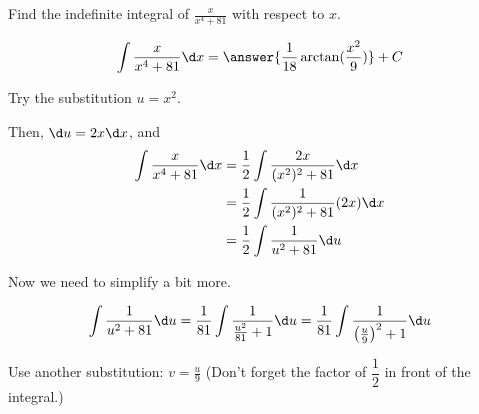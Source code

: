 \documentclass{ximera}
\author{Gregory Hartman \and Matthew Carr\and Nela Lakos \and Bobby Ramsey}
\begin{document}
\begin{exercise}

Find the indefinite integral of $\frac{x}{x^4+81}$ with respect to $x$.

\[
\int \frac{x}{x^4+81}\d x=\answer{\frac{1}{18}\arctan(\frac{x^2}{9})}+C
\]
\begin{hint}
	Try the substitution $u=x^2$.
\end{hint}

\begin{hint}
	Then,  $\d u=2x \d x$, and 
	\begin{align*}
		\int \frac{x}{x^4+81} \d x &= \dfrac{1}{2} \int \frac{2x}{(x^2)^2+81} \d x\\
			&= \dfrac{1}{2} \int \frac{1}{(x^2)^2+81} (2x) \d x\\
			&= \dfrac{1}{2} \int \frac{1}{u^2+81}  \d u
	\end{align*}
	
	Now we need to simplify a bit more.

	\[
	\int \frac{1}{u^2+81}\d u=\frac{1}{81}\int \frac{1}{\frac{u^2}{81}+1}\d u=\frac{1}{81}\int \frac{1}{\left(\frac{u}{9}\right)^2+1}\d u
	\]
	\begin{hint}
		Use another substitution: $v=\frac{u}{9}$ (Don't forget the factor of $\dfrac{1}{2}$ in front of the integral.)
	\end{hint}
\end{hint}
\end{exercise}
\end{document}
